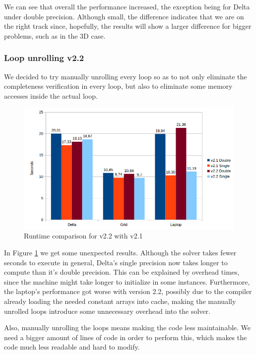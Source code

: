 \documentclass[12pt]{book}
\begin{document}
 We can see that overall the performance increased, the exception being for Delta under double precision. Although small, the difference indicates that we are on the right track since, hopefully, the results will show a larger difference for bigger problems, such as in the 3D case.
 
\subsubsection{Loop unrolling v2.2}
We decided to try manually unrolling every loop so as to not only eliminate the completeness verification in every loop, but also to eliminate some memory accesses inside the actual loop.

  \begin{figure}[H]
  	\centering
  	\includegraphics[width=\linewidth]{Resources/Images/v22.png}
  	\caption{Runtime comparison for v2.2 with v2.1}
  	\label{fig:v22}
  \end{figure}
  
  In Figure \ref{fig:v22} we get some unexpected results. Although the solver takes fewer seconds to execute in general, Delta's single precision now takes longer to compute than it's double precision. This can be explained by overhead times, since the machine might take longer to initialize in some instances. Furthermore, the laptop's performance got worse with version 2.2, possibly due to the compiler already loading the needed constant arrays into cache, making the manually unrolled loops introduce some unnecessary overhead into the solver.\par
  Also, manually unrolling the loops means making the code less maintainable. We need a bigger amount of lines of code in order to perform this, which makes the code much less readable and hard to modify.
  
\end{document}
